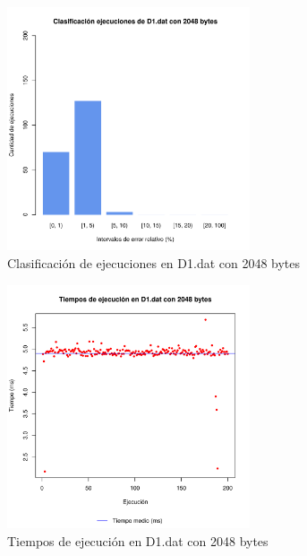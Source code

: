 \begin{figure}[h!]
    \centering
        \includegraphics[width=0.64\textwidth]{../figs/D1/plot_count_2048.pdf}
        \caption{Clasificación de ejecuciones en D1.dat con 2048 bytes}
    \label{figura:D1_count_2048}
\end{figure}

\begin{figure}[h!]
    \centering
        \includegraphics[width=0.64\textwidth]{../figs/D1/plot_time_2048.pdf}
        \caption{Tiempos de ejecución en D1.dat con 2048 bytes}
    \label{figura:D1_time_2048}
\end{figure}

\clearpage
